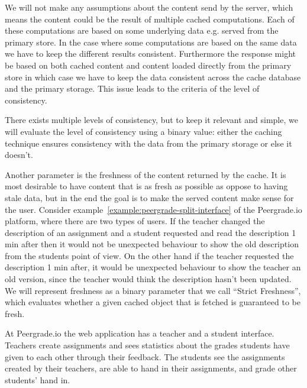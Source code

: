 

We will not make any assumptions about the content send by the server, which means the content could be the result of multiple cached computations. Each of these computations are based on some underlying data e.g. served from the primary store. In the case where some computations are based on the same data we have to keep the different results consistent. Furthermore the response might be based on both cached content and content loaded directly from the primary store in which case we have to keep the data consistent across the cache database and the primary storage. This issue leads to the criteria of the level of consistency.

There exists multiple levels of consistency, but to keep it relevant and simple, we will evaluate the level of consistency using a binary value: either the caching technique ensures consistency with the data from the primary storage or else it doesn't.


Another parameter is the freshness of the content returned by the cache. It is most desirable to have content that is as fresh as possible as oppose to having stale data, but in the end the goal is to make the served content make sense for the user. Consider example~\ref{example:peergrade-split-interface} of the Peergrade.io platform, where there are two types of users. If the teacher changed the description of an assignment and a student requested and read the description 1 min after then it would not be unexpected behaviour to show the old description from the students point of view. On the other hand if the teacher requested the description 1 min after, it would be unexpected behaviour to show the teacher an old version, since the teacher would think the description hasn't been updated. We will represent freshness as a binary parameter that we call ``Strict Freshness'', which evaluates whether a given cached object that is fetched is guaranteed to be fresh.

\begin{example}
\label{example:peergrade-split-interface}
At Peergrade.io the web application has a teacher and a student interface. Teachers create assignments and sees statistics about the grades students have given to each other through their feedback. The students see the assignments created by their teachers, are able to hand in their assignments, and grade other students' hand in.
\end{example}


